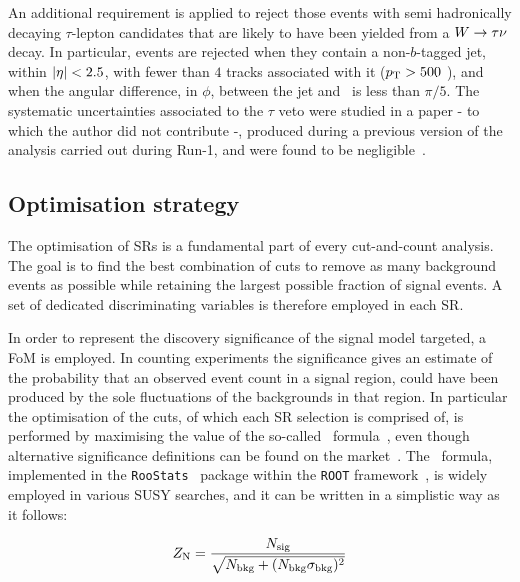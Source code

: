 				An additional requirement is applied to reject those events with semi hadronically decaying $\tau$-lepton candidates that are likely to have been yielded from a $W\rightarrow\tau\nu$ decay. In particular, events are rejected when they contain a non-$b$-tagged jet, within $|\eta| < 2.5$, with fewer than $4$ tracks associated with it ($p_{\mathrm{T}} > 500$ \MeV), and when the angular difference, in $\phi$, between the jet and \ptmiss\ is less than $\pi/5$. The systematic uncertainties associated to the $\tau$ veto were studied in a paper - to which the author did not contribute -, produced during a previous version of the analysis carried out during Run-1, and were found to be negligible~\cite{stop0LRun1}.



		\subsection{Optimisation strategy}

			The optimisation of \acp{SR} is a fundamental part of every cut-and-count analysis. The goal is to find the best combination of cuts to remove as many background events as possible while retaining the largest possible fraction of signal events. A set of dedicated discriminating variables is therefore employed in each \ac{SR}.

			In order to represent the discovery significance of the signal model targeted, a \ac{FoM} is employed. In counting experiments the significance gives an estimate of the probability that an observed event count in a signal region, could have been produced by the sole fluctuations of the backgrounds in that region. In particular the optimisation of the cuts, of which each \ac{SR} selection is comprised of, is performed by maximising the value of the so-called \Zn\ formula~\cite{Zn}, even though alternative significance definitions can be found on the market~\cite{sigHEP}. The \Zn\ formula, implemented in the \verb+RooStats+~\cite{2010acat.confE..57M} package within the \verb+ROOT+ framework~\cite{Brun:1997pa}, is widely employed in various \ac{SUSY} searches, and it can be written in a simplistic way as it follows: 

			\begin{equation}
				Z_\mathrm{N} = \frac{N_\mathrm{sig}}{\sqrt{ N_\mathrm{bkg} + (N_\mathrm{bkg}\sigma_\mathrm{bkg})^2}}
				\label{eq:Zn_forumla}
			\end{equation} 

